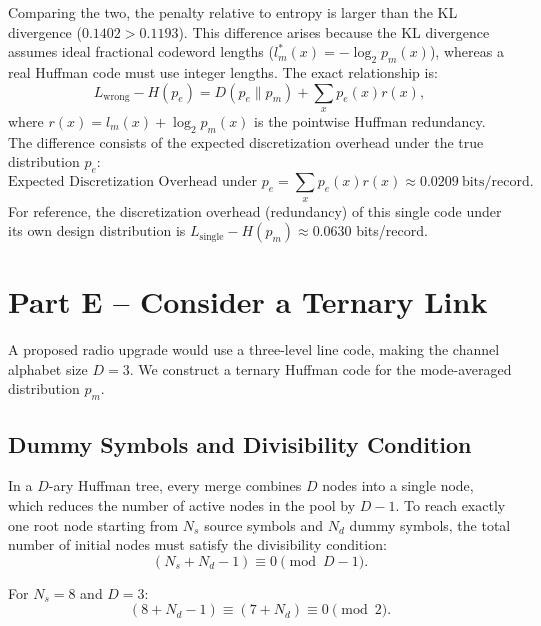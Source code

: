 \documentclass[11pt,a4paper]{article}
\begin{document}
Comparing the two, the penalty relative to entropy is larger than the KL divergence (\(0.1402 > 0.1193\)). This difference arises because the KL divergence assumes ideal fractional codeword lengths (\(l_m^*(x) = -\log_2 p_m(x)\)), whereas a real Huffman code must use integer lengths. The exact relationship is:
\begin{equation}
    L_{\mathrm{wrong}} - H(p_e) = D(p_e \parallel p_m) + \sum_{x} p_e(x) r(x),
\end{equation}
where \(r(x) = l_m(x) + \log_2 p_m(x)\) is the pointwise Huffman redundancy. The difference consists of the expected discretization overhead under the true distribution \(p_e\):
\begin{equation}
    \text{Expected Discretization Overhead under } p_e = \sum_{x} p_e(x) r(x) \approx \boxed{0.0209\ \text{bits/record}}.
\end{equation}
For reference, the discretization overhead (redundancy) of this single code under its own design distribution is \(L_{\mathrm{single}} - H(p_m) \approx 0.0630\) bits/record.


\section{Part E -- Consider a Ternary Link}

A proposed radio upgrade would use a three-level line code, making the channel alphabet size \(D = 3\). We construct a ternary Huffman code for the mode-averaged distribution \(p_m\).

\subsection{Dummy Symbols and Divisibility Condition}

In a \(D\)-ary Huffman tree, every merge combines \(D\) nodes into a single node, which reduces the number of active nodes in the pool by \(D - 1\). To reach exactly one root node starting from \(N_s\) source symbols and \(N_d\) dummy symbols, the total number of initial nodes must satisfy the divisibility condition:
\begin{equation}
    (N_s + N_d - 1) \equiv 0 \pmod{D - 1}.
\end{equation}

For \(N_s = 8\) and \(D = 3\):
\begin{equation}
    (8 + N_d - 1) \equiv (7 + N_d) \equiv 0 \pmod{2}.
\end{equation}
\end{document}
